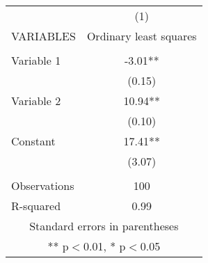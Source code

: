\begin{tabular}{lc} \hline
 & (1) \\
VARIABLES & Ordinary least squares \\ \hline
 &  \\
Variable 1 & -3.01** \\
 & (0.15) \\
Variable 2 & 10.94** \\
 & (0.10) \\
Constant & 17.41** \\
 & (3.07) \\
 &  \\
Observations & 100 \\
 R-squared & 0.99 \\ \hline
\multicolumn{2}{c}{ Standard errors in parentheses} \\
\multicolumn{2}{c}{ ** p$<$0.01, * p$<$0.05} \\
\end{tabular}
